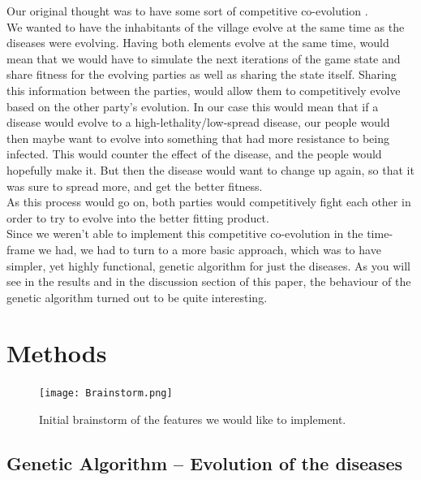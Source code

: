 \documentclass[conference,compsoc]{IEEEtran}
\begin{document}
Our original thought was to have some sort of competitive co-evolution \cite{rosin1995methods}.\\
We wanted to have the inhabitants of the village evolve at the same time as the diseases were evolving. Having both elements evolve at the same time, would mean that we would have to simulate the next iterations of the game state and share fitness for the evolving parties as well as sharing the state itself. Sharing this information between the parties, would allow them to competitively evolve based on the other party's evolution. In our case this would mean that if a disease would evolve to a high-lethality/low-spread disease, our people would then maybe want to evolve into something that had more resistance to being infected. This would counter the effect of the disease, and the people would hopefully make it. But then the disease would want to change up again, so that it was sure to spread more, and get the better fitness.\\
As this process would go on, both parties would competitively fight each other in order to try to evolve into the better fitting product.\\

Since we weren't able to implement this competitive co-evolution in the time-frame we had, we had to turn to a more basic approach, which was to have simpler, yet highly functional, genetic algorithm for just the diseases.  As you will see in the results and in the discussion section of this paper, the behaviour of the genetic algorithm turned out to be quite interesting.\\

\section{Methods}
\begin{figure}[!t]
	\centering
	\graphicspath{{imgs/}}
	\texttt{[image: Brainstorm.png]}
	\caption{Initial brainstorm of the features we would like to implement.}
	\label{fig:brainstorm}
\end{figure}
\subsection{Genetic Algorithm – Evolution of the diseases}
\end{document}

